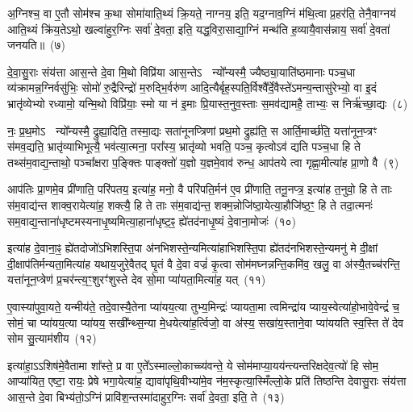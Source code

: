 अ॒ग्निश्च॒ वा ए॒तौ सोम॑श्च क॒था सोमा॑याति॒थ्यं क्रि॒यते॒ नाग्नय॒ इति॒ यद॒ग्नाव॒ग्निं म॑थि॒त्वा प्र॒हर॑ति॒ तेनै॒वाग्नय॑ आति॒थ्यं क्रि॑य॒ते\-ऽथो॒ खल्वा॑हुर॒ग्निः सर्वा॑ दे॒वता॒ इति॒ यद्ध॒विरा॒साद्या॒ग्निं मन्थ॑ति ह॒व्यायै॒वास॑न्नाय॒ सर्वा॑ दे॒वता॑ जनयति॥~(७)

{\anuvakamend[{पत्नि॑या ए॒व जग॑त्या॒ आ त्रि॒वृद्वै प॑रि॒धीन् व॑द॒न्त्येक॑चत्वारिꣳशच्च}]}%

दे॒वा॒सु॒राः संय॑त्ता आस॒न्ते दे॒वा मि॒थो विप्रि॑या आस॒न्ते\-ऽ  न्यो᳚न्यस्मै॒ ज्यैष्ठ्या॒याति॑ष्ठमानाः पञ्च॒धा व्य॑क्रामन्न॒ग्नि\-र्वसु॑भिः॒ सोमो॑ रु॒द्रैरिन्द्रो॑ म॒रुद्भि॒र्वरु॑ण आदि॒त्यैर्बृह॒स्पति॒र्विश्वै᳚र्दे॒वैस्ते॑\-ऽमन्य॒न्तासु॑रेभ्यो॒ वा इ॒दं भ्रातृ॑व्येभ्यो रध्यामो॒ यन्मि॒थो विप्रि॑याः॒ स्मो या न॑ इ॒माः प्रि॒यास्त॒नुव॒स्ताः स॒मव॑द्यामहै॒ ताभ्यः॒ स निर्\mbox{}ऋ॑च्छा॒द्यः~(८)

नः॒ प्र॒थ॒मो\-ऽ  न्यो᳚न्यस्मै॒ द्रुह्या॒दिति॒ तस्मा॒द्यः सता॑नूनप्त्रिणां प्रथ॒मो द्रुह्य॑ति॒ स आर्ति॒मार्च्छ॑ति॒ यत्ता॑नून॒प्त्रꣳ स॑मव॒द्यति॒ भ्रातृ॑व्याभिभूत्यै॒ भव॑त्या॒त्मना॒ परा᳚स्य॒ भ्रातृ॑व्यो भवति॒ पञ्च॒ कृत्वो\-ऽव॑ द्यति पञ्च॒धा हि ते तथ्स॑म॒वाद्य॒न्ताथो॒ पञ्चा᳚क्षरा प॒ङ्क्तिः पाङ्क्तो॑ य॒ज्ञो य॒ज्ञमे॒वाव॑ रुन्ध॒ आप॑तये त्वा गृह्णा॒मीत्या॑ह प्रा॒णो वै~(९)

आप॑तिः प्रा॒णमे॒व प्री॑णाति॒ परि॑पतय॒ इत्या॑ह॒ मनो॒ वै परि॑पति॒र्मन॑ ए॒व प्री॑णाति॒ तनू॒नप्त्र॒ इत्या॑ह त॒नुवो॒ हि ते ताः स॑म॒वाद्य॑न्त शाक्व॒रायेत्या॑ह॒ शक्त्यै॒ हि ते ताः स॑म॒वाद्य॑न्त॒ शक्म॒न्नोजि॑ष्ठा॒येत्या॒हौजि॑ष्ठ॒ꣳ॒ हि ते तदा॒त्मनः॑ सम॒वाद्य॒न्ताना॑धृष्टमस्यनाधृ॒ष्यमित्या॒हाना॑धृष्ट॒ꣴ॒ ह्ये॑तद॑नाधृ॒ष्यं दे॒वाना॒मोजः॑~(१०)

इत्या॑ह दे॒वाना॒ꣴ॒ ह्ये॑तदोजो॑\-ऽभिशस्ति॒पा अ॑नभिशस्ते॒न्यमित्या॑हाभिशस्ति॒पा ह्ये॑तद॑नभिशस्ते॒न्यमनु॑ मे दी॒क्षां दी॒क्षाप॑तिर्मन्यता॒मित्या॑ह यथाय॒जुरे॒वैतद् घृ॒तं वै दे॒वा वज्रं॑ कृ॒त्वा सोम॑मघ्नन्नन्ति॒कमि॑व॒ खलु॒ वा अ॑स्यै॒तच्च॑रन्ति॒ यत्ता॑नून॒प्त्रेण॑ प्र॒चर॑न्त्य॒ꣳ॒शुरꣳ॑शुस्ते देव सो॒मा प्या॑यता॒मित्या॑ह॒ यत्~(११)

ए॒वास्या॑पुवा॒यते॒ यन्मीय॑ते॒ तदे॒वास्यै॒तेना प्या॑यय॒त्या तुभ्य॒मिन्द्रः॑ प्यायता॒मा त्वमिन्द्रा॑य प्याय॒स्वेत्या॑हो॒भावे॒वेन्द्रं॑ च॒ सोमं॒ चा प्या॑यय॒त्या प्या॑यय॒ सखी᳚न्थ्स॒न्या मे॒धयेत्या॑ह॒र्त्विजो॒ वा अ॑स्य॒ सखा॑य॒स्ताने॒वा प्या॑ययति स्व॒स्ति ते॑ देव सोम सु॒त्याम॑शीय~(१२)

इत्या॑हा॒\-ऽऽ\-शिष॑मे॒वैतामा शा᳚स्ते॒ प्र वा ए॒ते᳚\-ऽस्माल्लो॒काच्च्य॑वन्ते॒ ये सोम॑माप्या॒यय॑न्त्यन्तरिक्षदेव॒त्यो॑ हि सोम॒ आप्या॑यित॒ एष्टा॒ रायः॒ प्रेषे भगा॒येत्या॑ह॒ द्यावा॑पृथि॒वीभ्या॑मे॒व न॑म॒स्कृत्या॒स्मिँल्लो॒के प्रति॑ तिष्ठन्ति देवासु॒राः संय॑त्ता आस॒न्ते दे॒वा बिभ्य॑तो॒\-ऽग्निं प्रावि॑श॒न्तस्मा॑दाहुर॒ग्निः सर्वा॑ दे॒वता॒ इति॒ ते~(१३)


